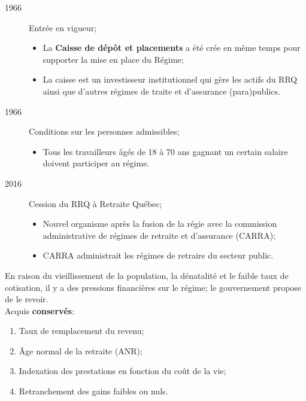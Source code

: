 \documentclass[10pt, french]{article}
\begin{document}
\begin{multicols*}{3}
\begin{rappel_enhanced}
\begin{description}
	\item[1966]	Entrée en vigueur;
		\begin{itemize}[leftmargin = *]
		\item	La \textbf{Caisse de dépôt et placements} a été crée en même temps pour supporter la mise en place du Régime;
		\item	La caisse est un investisseur institutionnel qui gère les actifs du RRQ ainsi que d'autres régimes de traite et d'assurance (para)publics.
		\end{itemize}
	\item[1966]	Conditions sur les personnes admissibles;
		\begin{itemize}[leftmargin = *]
		\item	Tous les travailleurs âgés de 18 à 70 ans gagnant un certain salaire doivent participer au régime.
		\end{itemize}
	\item[2016]	Cession du RRQ à Retraite Québec;
		\begin{itemize}[leftmargin = *]
		\item	Nouvel organisme après la fusion de la régie avec la commission administrative de régimes de retraite et d'assurance (CARRA);
		\item	CARRA administrait les régimes de retraire du secteur public.
		\end{itemize}
\end{description}
\end{rappel_enhanced}

\begin{rappel_enhanced}[Réforme de 1998]
En raison du vieillissement de la population, la dénatalité et le faible taux de cotisation, il y a des pressions financières sur le régime; le gouvernement propose de le revoir.\\

Acquis \textbf{conservés}:
\begin{enumerate}[leftmargin = *]
	\item	Taux de remplacement du revenu;
	\item	Âge normal de la retraite (ANR);
	\item	Indexation des prestations en fonction du coût de la vie;
	\item	Retranchement des gains faibles ou nuls.
\end{enumerate}


\end{rappel_enhanced}
\end{multicols*}
\end{document}
